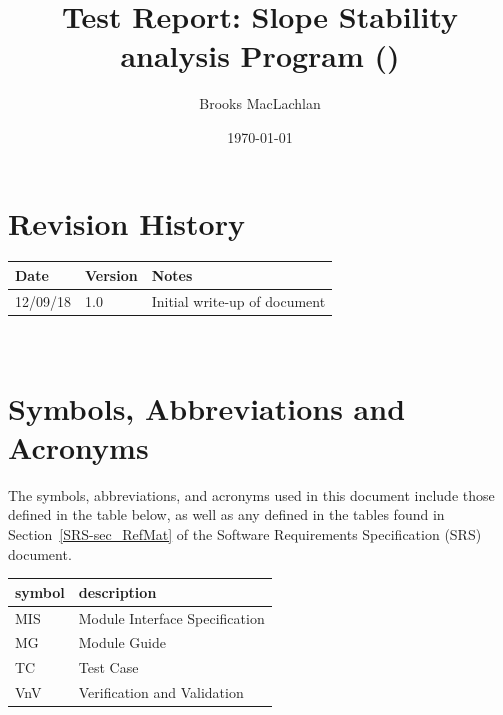 \documentclass[12pt, titlepage]{article}
\begin{document}
\title{Test Report: Slope Stability analysis Program (\progname{})} 
\author{Brooks MacLachlan}
\date{\today}
	
\maketitle


\section{Revision History}

\begin{tabularx}{\textwidth}{p{3cm}p{2cm}X}
\toprule {\bf Date} & {\bf Version} & {\bf Notes}\\
\midrule
12/09/18 & 1.0 & Initial write-up of document\\
\bottomrule
\end{tabularx}

~\newpage

\section{Symbols, Abbreviations and Acronyms}

The symbols, abbreviations, and acronyms used in this document include those 
defined in the table below, as well as any defined in the tables found in 
Section~\ref{SRS-sec_RefMat} of the Software Requirements Specification (SRS) 
document.
\newline

\renewcommand{\arraystretch}{1.2}
\begin{tabular}{l l} 
	\toprule		
	\textbf{symbol} & \textbf{description}\\
	\midrule
	MIS & Module Interface Specification\\
	MG & Module Guide\\
	TC & Test Case\\
	VnV & Verification and Validation\\
	\bottomrule
\end{tabular}\\

\newpage

\tableofcontents

\listoftables %

\listoffigures %

\newpage

\end{document}

